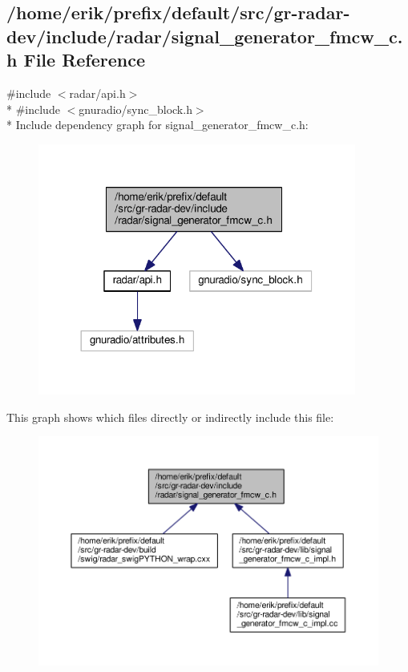 \subsection{/home/erik/prefix/default/src/gr-\/radar-\/dev/include/radar/signal\+\_\+generator\+\_\+fmcw\+\_\+c.h File Reference}
\label{signal__generator__fmcw__c_8h}
{\ttfamily \#include $<$radar/api.\+h$>$}\\*
{\ttfamily \#include $<$gnuradio/sync\+\_\+block.\+h$>$}\\*
Include dependency graph for signal\+\_\+generator\+\_\+fmcw\+\_\+c.\+h\+:
\nopagebreak
\begin{figure}[H]
\begin{center}
\leavevmode
\includegraphics[width=296pt]{de/d41/signal__generator__fmcw__c_8h__incl}
\end{center}
\end{figure}
This graph shows which files directly or indirectly include this file\+:
\nopagebreak
\begin{figure}[H]
\begin{center}
\leavevmode
\includegraphics[width=350pt]{d7/d97/signal__generator__fmcw__c_8h__dep__incl}
\end{center}
\end{figure}
